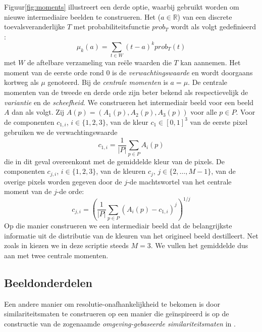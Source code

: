 Figuur\ref{fig:moments} illustreert een derde optie, waarbij  gebruikt
worden om nieuwe intermediaire beelden te construeren. Het  ($a
\in \mathbb{R}$) van een discrete toevalsveranderlijke $T$ met
probabiliteitsfunctie $prob_T$ wordt als volgt gedefinieerd
\cite{demeyer:statistiek}: 
\begin{displaymath}
\mu_k(a) = \sum_{t \in W} (t-a)^k prob_T(t)
\end{displaymath}
met $W$ de aftelbare verzameling van re\"ele waarden die $T$ kan aannemen. Het
moment
van de eerste orde rond $0$ is de \emph{verwachtingswaarde} en wordt doorgaans kortweg als
$\mu$ genoteerd. Bij de \emph{centrale momenten} is $a=\mu$. De centrale 
momenten van de tweede en derde orde zijn beter bekend als respectievelijk de
\emph{variantie} en de \emph{scheefheid}. We construeren het intermediair beeld
voor een beeld $A$ dan als volgt. Zij $A(p)=(A_1(p),A_2(p),A_3(p))$ voor
alle $p \in P$. Voor de componenten $c_{1,i}$, $i \in \{1,2,3\}$, van de
kleur $c_1 \in [0,1]^3$ van de eerste pixel gebruiken we de verwachtingswaarde
\begin{displaymath}
c_{1,i} = \frac{1}{|P|} \sum_{p \in P} A_i(p)  
\end{displaymath}
die in dit geval overeenkomt met de gemiddelde kleur van de pixels.
De componenten $c_{j,i}$, $i \in \{1,2,3\}$, van de kleuren $c_j$, $j \in
\{2,\ldots,M-1\}$, van de overige pixels worden gegeven door de $j$-de
machtswortel van het centrale moment van de $j$-de orde:
\begin{displaymath}
c_{j,i} = \left( \frac{1}{|P|} \sum_{p \in P} (A_i(p) - c_{1,i})^j \right)^{1/j}
\end{displaymath}
Op die manier construeren we een intermediair beeld dat de
belangrijkste informatie uit de distributie van de kleuren van het origineel beeld
destilleert. Net zoals in \cite{stricker:similarity_of_color_images} kiezen we 
in deze scriptie steeds $M = 3$. We vullen het gemiddelde dus aan met twee
centrale momenten.

\subsection{Beeldonderdelen}

Een andere manier om resolutie-onafhankelijkheid te bekomen is door similariteitsmaten te construeren 
op een manier die ge\"inspireerd is op de constructie van de zogenaamde \emph{omgeving-gebaseerde 
similariteitsmaten} in \cite{vanderweken:similariteitsmaten}. 

